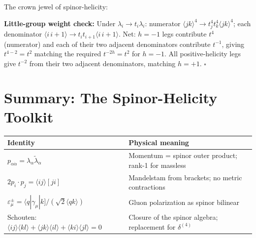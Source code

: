\documentclass[12pt]{article}
\begin{document}
The crown jewel of spinor-helicity:


\textbf{Little-group weight check:} Under $\lambda_i\to t_i\lambda_i$:
numerator $\langle jk\rangle^4\to t_j^4t_k^4\langle jk\rangle^4$;
each denominator $\langle i\,i+1\rangle\to t_i t_{i+1}\langle i\,i+1\rangle$.
Net: $h=-1$ legs contribute $t^4$ (numerator) and each of their two
adjacent denominators contribute $t^{-1}$, giving $t^{4-2}=t^2$ matching
the required $t^{-2h}=t^2$ for $h=-1$.  All positive-helicity legs
give $t^{-2}$ from their two adjacent denominators, matching $h=+1$.  $\square$

\section{Summary: The Spinor-Helicity Toolkit}

\begin{center}
\begin{tabular}{|p{}|p{}|}
\hline
\textbf{Identity} & \textbf{Physical meaning} \\
\hline
$p_{\alpha\dot\alpha}=\lambda_\alpha\tilde\lambda_{\dot\alpha}$ &
Momentum = spinor outer product; rank-1 for massless \\
\hline
$2p_i\cdot p_j=\langle ij\rangle[ji]$ &
Mandelstam from brackets; no metric contractions \\
\hline
$\varepsilon^\pm_\mu=\langle q|\gamma_\mu|k]/(\sqrt2\langle qk\rangle)$ &
Gluon polarization as spinor bilinear \\
\hline
Schouten: $\langle ij\rangle\langle kl\rangle+\langle jk\rangle\langle il\rangle+\langle ki\rangle\langle jl\rangle=0$ &
Closure of the spinor algebra; replacement for $\delta^{(4)}$ \\
\hline
\end{tabular}
\end{center}

\vfill
\end{document}
